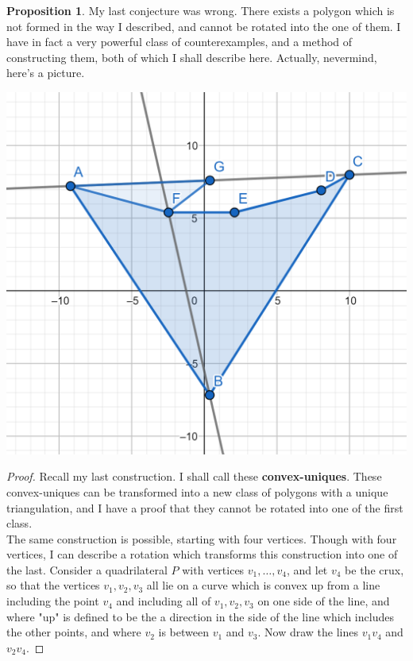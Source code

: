 \documentclass[12pt]{article}
\theoremstyle{definition}
\newtheorem{proposition}{Proposition}
\begin{document}
\begin{proposition}
My last conjecture was wrong. There exists a polygon which is not formed in the way I described, and cannot be rotated into the one of them. I have in fact a very powerful class of counterexamples, and a method of constructing them, both of which I shall describe here. Actually, nevermind, here's a picture. 

\includegraphics[scale=1]{counterexample.png} 

\end{proposition}

\begin{proof}
Recall my last construction. I shall call these \textbf{convex-uniques}. These convex-uniques can be transformed into a new class of polygons with a unique triangulation, and I have a proof that they cannot be rotated into one of the first class.\\

The same construction is possible, starting with four vertices. Though with four vertices, I can describe a rotation which transforms this construction into one of the last. Consider a quadrilateral $P$ with vertices $v_1, \dots, v_4$, and let $v_4$ be the crux, so that the vertices $v_1,v_2,v_3$ all lie on a curve which is convex up from a line including the point $v_4$ and including all of $v_1,v_2,v_3$ on one side of the line, and where "up" is defined to be the a direction in the side of the line which includes the other points, and where $v_2$ is between $v_1$ and $v_3$. Now draw the lines $v_1v_4$ and $v_2v_4$. 
\end{proof}
\end{document}
